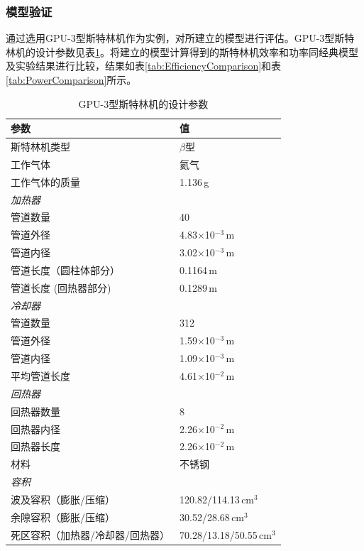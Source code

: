 \subsubsection{模型验证}
\label{sec:modelValidation}

通过选用GPU-3型斯特林机作为实例，对所建立的模型进行评估。GPU-3型斯特林机的设计参数见表\ref{tab:GPU3parameters}。将建立的模型计算得到的斯特林机效率和功率同经典模型及实验结果进行比较，结果如表\ref{tab:EfficiencyComparison}和表\ref{tab:PowerComparison}所示。

\begin{table}[htbp]\footnotesize
\setlength{\abovecaptionskip}{-10pt}
	\caption{GPU-3型斯特林机的设计参数\cite{Babaelahi2015,Martini1983}}
	\begin{center}
	\begin{tabular}{ll}
		\toprule
		参数				&	值\\
		\midrule
		斯特林机类型					&	$\beta$型\\
		工作气体			&	氦气\\
		工作气体的质量	&	1.136\,g\\
		\emph{加热器}			&\\
		管道数量		&	40\\
		管道外径	&	4.83$\times$10$^{-3}\,\mathrm{m}$\\
		管道内径	&	3.02$\times$10$^{-3}\,\mathrm{m}$\\
		管道长度（圆柱体部分）		&	0.1164\,m\\
		管道长度 (回热器部分)		&	0.1289\,m\\
		\emph{冷却器}			&\\
		管道数量		&	312\\
		管道外径	&	1.59$\times$10$^{-3}\,\mathrm{m}$\\
		管道内径	&	1.09$\times$10$^{-3}\,\mathrm{m}$\\
		平均管道长度		&	4.61$\times$10$^{-2}\,\mathrm{m}$\\
		\emph{回热器}		&\\
		回热器数量	&	8\\
		回热器内径	&	2.26$\times$10$^{-2}\,\mathrm{m}$\\
		回热器长度		&	2.26$\times$10$^{-2}\,\mathrm{m}$\\
		材料				&	不锈钢\\
		\emph{容积}			&\\
		波及容积（膨胀/压缩）	&	120.82/114.13\,$\mathrm{cm}^3$\\
		余隙容积（膨胀/压缩）	&	30.52/28.68\,$\mathrm{cm}^3$\\
		死区容积（加热器/冷却器/回热器）	&	70.28/13.18/50.55\,$\mathrm{cm}^3$\\
		\bottomrule
	\end{tabular}
	\end{center}
	\label{tab:GPU3parameters}
\end{table}

